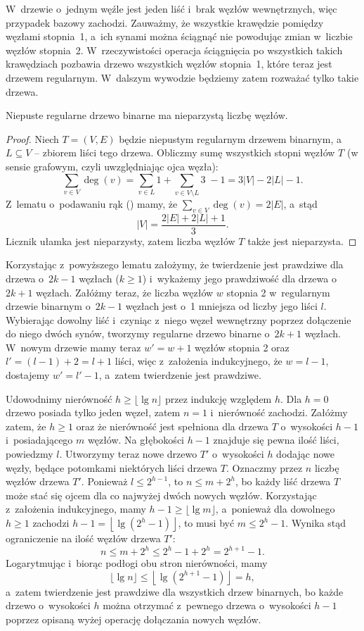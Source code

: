 \exercise %
W~drzewie o~jednym węźle jest jeden liść i~brak węzłów wewnętrznych, więc przypadek bazowy zachodzi. Zauważmy, że wszystkie krawędzie pomiędzy węzłami stopnia~1, a~ich synami można ściągnąć nie powodując zmian w~liczbie węzłów stopnia~2. W~rzeczywistości operacja ściągnięcia po wszystkich takich krawędziach pozbawia drzewo wszystkich węzłów stopnia~1, które teraz jest drzewem regularnym. W~dalszym wywodzie będziemy zatem rozważać tylko takie drzewa.
\begin{lemat}
	Niepuste regularne drzewo binarne ma nieparzystą liczbę węzłów.
\end{lemat}
\begin{proof}
Niech $T=(V,E)$ będzie niepustym regularnym drzewem binarnym, a~$L\subseteq V$ -- zbiorem liści tego drzewa. Obliczmy sumę wszystkich stopni węzłów $T$ (w sensie grafowym, czyli uwzględniając ojca węzła):
\[
	\sum_{v\in V}\deg(v) = \sum_{v\in L}1+\sum_{v\in V\setminus L}\!\!\!3\;-1=3|V|-2|L|-1.
\]
Z~lematu o~podawaniu rąk () mamy, że $\sum_{v\in V}\deg(v) = 2|E|$, a~stąd
\[
	|V| = \frac{2|E|+2|L|+1}{3}.
\]
Licznik ułamka jest nieparzysty, zatem liczba węzłów $T$ także jest nieparzysta.
\end{proof}

Korzystając z~powyższego lematu założymy, że twierdzenie jest prawdziwe dla drzewa o~$2k-1$ węzłach ($k\ge1$) i~wykażemy jego prawdziwość dla drzewa o~$2k+1$ węzłach. Załóżmy teraz, że liczba węzłów $w$ stopnia 2 w~regularnym drzewie binarnym o~$2k-1$ węzłach jest o~1 mniejsza od liczby jego liści $l$. Wybierając dowolny liść i~czyniąc z~niego węzeł wewnętrzny poprzez dołączenie do niego dwóch synów, tworzymy regularne drzewo binarne o~$2k+1$ węzłach. W~nowym drzewie mamy teraz $w'=w+1$ węzłów stopnia 2 oraz $l'=(l-1)+2=l+1$ liści, więc z~założenia indukcyjnego, że $w=l-1$, dostajemy $w'=l'-1$, a~zatem twierdzenie jest prawdziwe.

\exercise %
Udowodnimy nierówność $h\ge\lfloor\lg n\rfloor$ przez indukcję względem $h$. Dla $h=0$ drzewo posiada tylko jeden węzeł, zatem $n=1$ i~nierówność zachodzi. Załóżmy zatem, że $h\ge1$ oraz że nierówność jest spełniona dla drzewa $T$ o~wysokości $h-1$ i~posiadającego $m$ węzłów. Na głębokości $h-1$ znajduje się pewna ilość liści, powiedzmy $l$. Utworzymy teraz nowe drzewo $T'$ o~wysokości $h$ dodając nowe węzły, będące potomkami niektórych liści drzewa $T$. Oznaczmy przez $n$ liczbę węzłów drzewa $T'$. Ponieważ $l\le2^{h-1}$, to $n\le m+2^h$, bo każdy liść drzewa $T$ może stać się ojcem dla co najwyżej dwóch nowych węzłów. Korzystając z~założenia indukcyjnego, mamy $h-1\ge\lfloor\lg m\rfloor$, a~ponieważ dla dowolnego $h\ge1$ zachodzi $h-1=\left\lfloor\lg(2^h-1)\right\rfloor$, to musi być $m\le 2^h-1$. Wynika stąd ograniczenie na ilość węzłów drzewa $T'$:
\[
	n \le m+2^h \le 2^h-1+2^h = 2^{h+1}-1.
\]
Logarytmując i~biorąc podłogi obu stron nierówności, mamy
\[
	\lfloor\lg n\rfloor \le \left\lfloor\lg(2^{h+1}-1)\right\rfloor = h,
\]
a~zatem twierdzenie jest prawdziwe dla wszystkich drzew binarnych, bo każde drzewo o~wysokości $h$ można otrzymać z~pewnego drzewa o~wysokości $h-1$ poprzez opisaną wyżej operację dołączania nowych węzłów.

